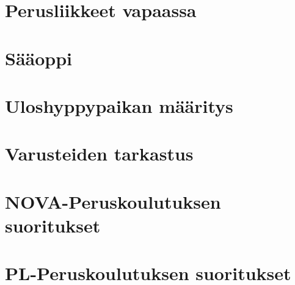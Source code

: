 \documentclass[10pt,twoside,openany,hidelinks]{memoir}
\begin{document}
\chapter{Perusliikkeet vapaassa}
\label{perusliikkeet-vapaassa}
\thispagestyle{headings}
\begin{multicols}{2}
\end{multicols}

\chapter{Sääoppi}
\label{saaoppi}
\thispagestyle{headings}
\begin{multicols}{2}
\end{multicols}

\chapter{Uloshyppypaikan määritys}
\label{uloshyppypaikan-maaritys}
\thispagestyle{headings}
\begin{multicols}{2}
\end{multicols}

\chapter{Varusteiden tarkastus}
\label{varusteiden-tarkastus}
\thispagestyle{headings}
\begin{multicols}{2}
\end{multicols}

\chapter{NOVA-Peruskoulutuksen suoritukset}
\label{nova-peruskoulutuksen-suoritukset}
\thispagestyle{headings}
\begin{multicols}{2}
\end{multicols}

\chapter{PL-Peruskoulutuksen suoritukset}
\label{pl-peruskoulutuksen-suoritukset}
\thispagestyle{headings}
\begin{multicols}{2}
\end{multicols}
\end{document}

